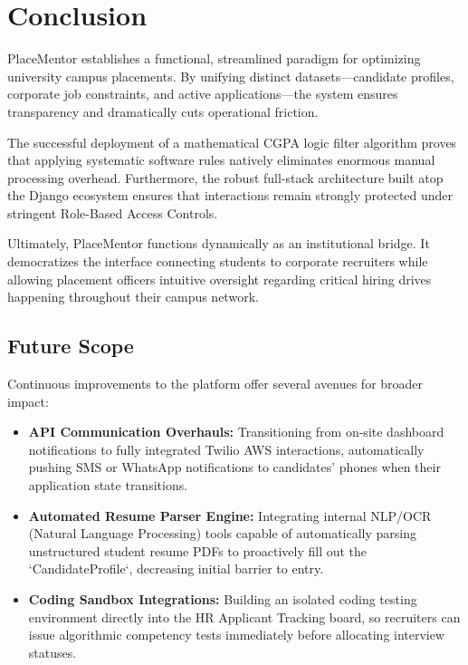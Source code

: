 \documentclass[a4paper,12pt]{report}
\begin{document}
\chapter{Conclusion}

PlaceMentor establishes a functional, streamlined paradigm for optimizing university campus placements. By unifying distinct datasets—candidate profiles, corporate job constraints, and active applications—the system ensures transparency and dramatically cuts operational friction. 

The successful deployment of a mathematical CGPA logic filter algorithm proves that applying systematic software rules natively eliminates enormous manual processing overhead. Furthermore, the robust full-stack architecture built atop the Django ecosystem ensures that interactions remain strongly protected under stringent Role-Based Access Controls. 

Ultimately, PlaceMentor functions dynamically as an institutional bridge. It democratizes the interface connecting students to corporate recruiters while allowing placement officers intuitive oversight regarding critical hiring drives happening throughout their campus network.

\section{Future Scope}

Continuous improvements to the platform offer several avenues for broader impact:

\begin{itemize}
    \item \textbf{API Communication Overhauls:} Transitioning from on-site dashboard notifications to fully integrated Twilio AWS interactions, automatically pushing SMS or WhatsApp notifications to candidates' phones when their application state transitions.
    \item \textbf{Automated Resume Parser Engine:} Integrating internal NLP/OCR (Natural Language Processing) tools capable of automatically parsing unstructured student resume PDFs to proactively fill out the `CandidateProfile`, decreasing initial barrier to entry.
    \item \textbf{Coding Sandbox Integrations:} Building an isolated coding testing environment directly into the HR Applicant Tracking board, so recruiters can issue algorithmic competency tests immediately before allocating interview statuses.
\end{itemize}
\end{document}
